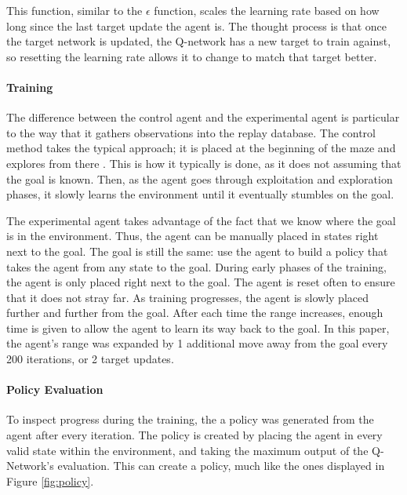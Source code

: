 \documentclass[12pt,letterpaper]{article}
\begin{document}
This function, similar to the $\epsilon$ function, scales the learning rate based on how long since the last target update the agent is.
The thought process is that once the target network is updated, the Q-network has a new target to train against, so resetting the learning rate allows it to change to match that target better.

\paragraph{Training} 

The difference between the control agent and the experimental agent is particular to the way that it gathers observations into the replay database.
The control method takes the typical approach; it is placed at the beginning of the maze and explores from there \cite{article_reinforcement_learning_survey}.
This is how it typically is done, as it does not assuming that the goal is known.
Then, as the agent goes through exploitation and exploration phases, it slowly learns the environment until it eventually stumbles on the goal.

The experimental agent takes advantage of the fact that we know where the goal is in the environment.
Thus, the agent can be manually placed in states right next to the goal.
The goal is still the same: use the agent to build a policy that takes the agent from any state to the goal.
During early phases of the training, the agent is only placed right next to the goal.
The agent is reset often to ensure that it does not stray far.
As training progresses, the agent is slowly placed further and further from the goal.
After each time the range increases, enough time is given to allow the agent to learn its way back to the goal.
In this paper, the agent's range was expanded by 1 additional move away from the goal every 200 iterations, or 2 target updates.

\paragraph{Policy Evaluation}

To inspect progress during the training, the a policy was generated from the agent after every iteration.
The policy is created by placing the agent in every valid state within the environment, and taking the maximum output of the Q-Network's evaluation.
This can create a policy, much like the ones displayed in Figure \ref{fig:policy}.
\end{document}
